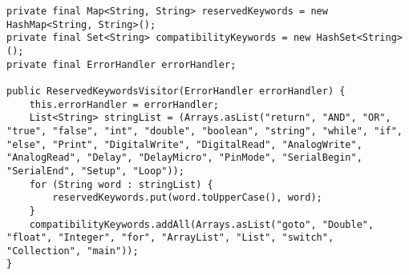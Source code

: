 \begin{lstlisting}[caption={Constructor of the reserved keyword visitor where keywords are stored in a HashMap and HashSet.}, label={code:RKW:keywordList}]
private final Map<String, String> reservedKeywords = new HashMap<String, String>();
private final Set<String> compatibilityKeywords = new HashSet<String>();
private final ErrorHandler errorHandler;

public ReservedKeywordsVisitor(ErrorHandler errorHandler) {
    this.errorHandler = errorHandler;
    List<String> stringList = (Arrays.asList("return", "AND", "OR", "true", "false", "int", "double", "boolean", "string", "while", "if", "else", "Print", "DigitalWrite", "DigitalRead", "AnalogWrite", "AnalogRead", "Delay", "DelayMicro", "PinMode", "SerialBegin", "SerialEnd", "Setup", "Loop"));
    for (String word : stringList) {
        reservedKeywords.put(word.toUpperCase(), word);
    }
    compatibilityKeywords.addAll(Arrays.asList("goto", "Double", "float", "Integer", "for", "ArrayList", "List", "switch", "Collection", "main"));
}
\end{lstlisting}